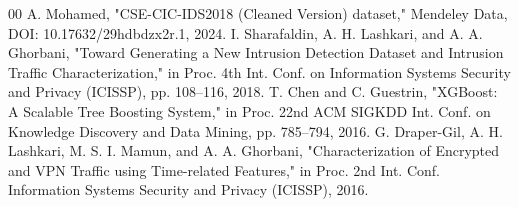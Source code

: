\documentclass[conference]{IEEEtran}
\begin{document}
\begin{thebibliography}{00}
 A. Mohamed, "CSE-CIC-IDS2018 (Cleaned Version) dataset," Mendeley Data, DOI: 10.17632/29hdbdzx2r.1, 2024.  
 I. Sharafaldin, A. H. Lashkari, and A. A. Ghorbani, "Toward Generating a New Intrusion Detection Dataset and Intrusion Traffic Characterization," in Proc. 4th Int. Conf. on Information Systems Security and Privacy (ICISSP), pp. 108–116, 2018.  
 T. Chen and C. Guestrin, "XGBoost: A Scalable Tree Boosting System," in Proc. 22nd ACM SIGKDD Int. Conf. on Knowledge Discovery and Data Mining, pp. 785–794, 2016.  
 G. Draper-Gil, A. H. Lashkari, M. S. I. Mamun, and A. A. Ghorbani, "Characterization of Encrypted and VPN Traffic using Time-related Features," in Proc. 2nd Int. Conf. Information Systems Security and Privacy (ICISSP), 2016.
\end{thebibliography}
\end{document}
